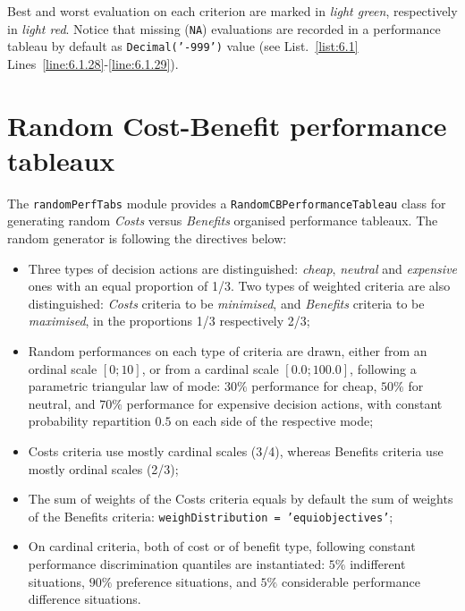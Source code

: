 Best and worst evaluation on each criterion are marked in \emph{light green}, respectively in \emph{light red}. Notice that missing (\texttt{NA}) evaluations are recorded in a performance tableau by default as \texttt{Decimal('-999')} value (see List.~\vref{list:6.1} Lines~\ref{line:6.1.28}-\ref{line:6.1.29}).	    

\section{Random Cost-Benefit performance tableaux}
\label{sec:6.3}

The \texttt{randomPerfTabs} module provides a \texttt{RandomCBPerformanceTableau} class for generating random \emph{Costs} versus \emph{Benefits} organised performance tableaux. The random generator is following the directives below:
\begin{itemize}[leftmargin=0.5cm,rightmargin=0.25cm]
\item Three types of decision actions are distinguished: \emph{cheap}, \emph{neutral} and \emph{expensive} ones with an equal proportion of 1/3. Two types of weighted criteria are also distinguished: \emph{Costs} criteria to be \emph{minimised}, and \emph{Benefits} criteria to be \emph{maximised}, in the proportions 1/3 respectively 2/3;
\item  Random performances on each type of criteria  are drawn, either from an ordinal scale $[0;10]$, or from a cardinal scale $[0.0;100.0]$, following a parametric triangular law of mode: $30\%$ performance for cheap, $50\%$ for neutral, and $70\%$ performance for expensive decision actions, with constant probability repartition $0.5$ on each side of the respective mode;
\item Costs criteria use mostly cardinal scales (3/4), whereas Benefits criteria use mostly ordinal scales (2/3); 
\item  The sum of weights of the Costs criteria equals by default the sum of weights of the Benefits criteria: \texttt{weighDistribution = 'equiobjectives'};
\item On cardinal criteria, both of cost or of benefit type, following constant performance discrimination quantiles are instantiated: $5\%$ indifferent situations, $90\%$ preference situations, and $5\%$ considerable performance difference situations. 
\end{itemize}

